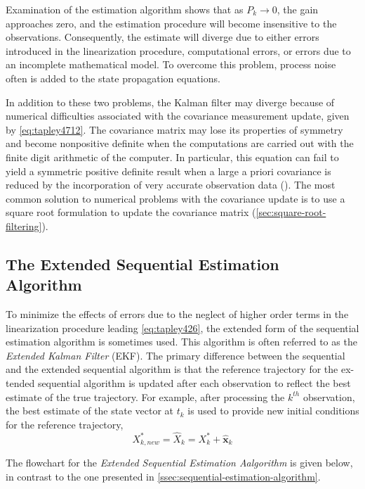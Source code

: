 Examination of the estimation algorithm shows that as \(P_k \to 0\), the gain 
approaches zero, and the estimation procedure will become insensitive to the 
observations. Consequently, the estimate will diverge due to either errors introduced 
in the linearization procedure, computational errors, or errors due to an incomplete 
mathematical model. To overcome this problem, process noise often is added to 
the state propagation equations.

In addition to these two problems, the Kalman filter may diverge because of
numerical difficulties associated with the covariance measurement update, given by 
\ref{eq:tapley4712}. The covariance matrix may lose its properties of symmetry and 
become nonpositive definite when the computations are carried out with the finite 
digit arithmetic of the computer. In particular, this equation can fail to yield a 
symmetric positive definite result when a large a priori covariance is reduced by 
the incorporation of very accurate observation data (\cite{tapley}). The most common 
solution to numerical problems with the covariance update is to use a square root 
formulation to update the covariance matrix (\ref{sec:square-root-filtering}).

\subsection{The Extended Sequential Estimation Algorithm}
To minimize the effects of errors due to the neglect of higher order terms in the
linearization procedure leading \ref{eq:tapley426}, the extended form of the sequential
estimation algorithm is sometimes used. This algorithm is often referred to as the
\emph{Extended Kalman Filter} (EKF). The primary difference between the sequential
and the extended sequential algorithm is that the reference trajectory for the ex-
tended sequential algorithm is updated after each observation to reflect the best
estimate of the true trajectory. For example, after processing the \(k^{th}\) observation, 
the best estimate of the state vector at \(t_k\) is used to provide new initial 
conditions for the reference trajectory,
\begin{equation}
  X^*_{k,new} = \hat{X}_k = X^*_k + \hat{\bm{x}}_k
\end{equation}

The flowchart for the \emph{Extended Sequential Estimation Aalgorithm} is given below, 
in contrast to the one presented in \ref{ssec:sequential-estimation-algorithm}.

